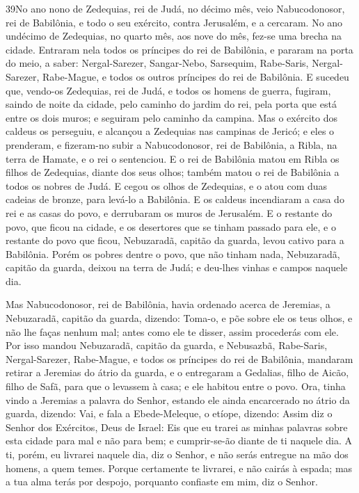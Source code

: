 \lettrine{39} No ano nono de Zedequias, rei de Judá, no décimo
mês, veio Nabucodonosor, rei de Babilônia, e todo o seu exército,
contra Jerusalém, e a cercaram. No ano undécimo de Zedequias, no
quarto mês, aos nove do mês, fez-se uma brecha na cidade.
Entraram nela todos os príncipes do rei de Babilônia, e pararam
na porta do meio, a saber: Nergal-Sarezer, Sangar-Nebo, Sarsequim,
Rabe-Saris, Nergal-Sarezer, Rabe-Mague, e todos os outros príncipes
do rei de Babilônia. E sucedeu que, vendo-os Zedequias, rei de
Judá, e todos os homens de guerra, fugiram, saindo de noite da
cidade, pelo caminho do jardim do rei, pela porta que está entre os
dois muros; e seguiram pelo caminho da campina. Mas o exército
dos caldeus os perseguiu, e alcançou a Zedequias nas campinas de
Jericó; e eles o prenderam, e fizeram-no subir a Nabucodonosor, rei
de Babilônia, a Ribla, na terra de Hamate, e o rei o sentenciou.
E o rei de Babilônia matou em Ribla os filhos de Zedequias,
diante dos seus olhos; também matou o rei de Babilônia a todos os
nobres de Judá. E cegou os olhos de Zedequias, e o atou com duas
cadeias de bronze, para levá-lo a Babilônia. E os caldeus
incendiaram a casa do rei e as casas do povo, e derrubaram os muros
de Jerusalém. E o restante do povo, que ficou na cidade, e os
desertores que se tinham passado para ele, e o restante do povo que
ficou, Nebuzaradã, capitão da guarda, levou cativo para a Babilônia.
Porém os pobres dentre o povo, que não tinham nada,
Nebuzaradã, capitão da guarda, deixou na terra de Judá; e deu-lhes
vinhas e campos naquele dia.

Mas Nabucodonosor, rei de Babilônia, havia ordenado acerca de
Jeremias, a Nebuzaradã, capitão da guarda, dizendo: Toma-o, e
põe sobre ele os teus olhos, e não lhe faças nenhum mal; antes como
ele te disser, assim procederás com ele. Por isso mandou
Nebuzaradã, capitão da guarda, e Nebusazbã, Rabe-Saris,
Nergal-Sarezer, Rabe-Mague, e todos os príncipes do rei de
Babilônia, mandaram retirar a Jeremias do átrio da guarda, e
o entregaram a Gedalias, filho de Aicão, filho de Safã, para que o
levassem à casa; e ele habitou entre o povo. Ora, tinha vindo
a Jeremias a palavra do Senhor, estando ele ainda encarcerado no
átrio da guarda, dizendo: Vai, e fala a Ebede-Meleque, o
etíope, dizendo: Assim diz o Senhor dos Exércitos, Deus de Israel:
Eis que eu trarei as minhas palavras sobre esta cidade para mal e
não para bem; e cumprir-se-ão diante de ti naquele dia. A ti,
porém, eu livrarei naquele dia, diz o Senhor, e não serás entregue
na mão dos homens, a quem temes. Porque certamente te
livrarei, e não cairás à espada; mas a tua alma terás por despojo,
porquanto confiaste em mim, diz o Senhor.


